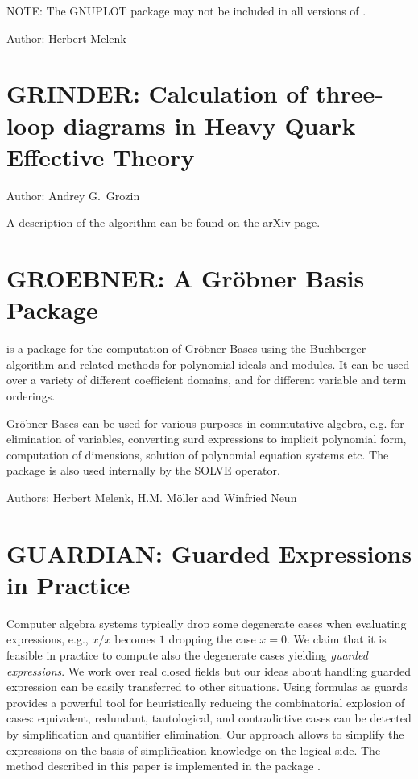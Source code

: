 NOTE: The GNUPLOT package may not be included in all versions of \REDUCE.

Author: Herbert Melenk


\fi

\newpage

\section{GRINDER: Calculation of three-loop diagrams in Heavy Quark Effective Theory}
\label{GRINDER}

Author: Andrey G.~Grozin

A description of the algorithm can be found on the \href{https://arxiv.org/abs/hep-ph/0002266}{arXiv page}.

\newpage

\section{GROEBNER: A Gr\"{o}bner Basis Package}
\label{GROEBNER}

 is a package for the computation of Gr\"obner
Bases using the Buchberger algorithm and related methods
for polynomial ideals and modules.  It can be used over a variety of
different coefficient domains, and for different variable and term
orderings.

Gr\"obner Bases can be used for various purposes in commutative
algebra, e.g. for elimination of variables,
converting surd expressions to implicit polynomial form,
computation of dimensions, solution of polynomial equation systems
 etc.
The package is also used internally by the \f{SOLVE}
operator.

Authors: Herbert Melenk, H.M. M\"oller and Winfried Neun



\newpage

\section{GUARDIAN: Guarded Expressions in Practice}
\label{GUARDIAN}

Computer algebra systems typically drop some degenerate cases when
evaluating expressions, e.g., $x/x$ becomes $1$ dropping the case
$x=0$. We claim that it is feasible in practice to compute also the
degenerate cases yielding \emph{guarded expressions}. We work over real
closed fields but our ideas about handling guarded expression can be
easily transferred to other situations. Using formulas as guards
provides a powerful tool for heuristically reducing the combinatorial
explosion of cases: equivalent, redundant, tautological, and
contradictive cases can be detected by simplification and quantifier
elimination. Our approach allows to simplify the expressions on the
basis of simplification knowledge on the logical side. The method
described in this paper is implemented in the \REDUCE package
.

